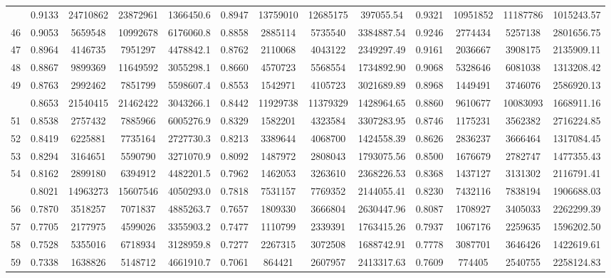 \documentclass[
  12pt,
]{article}
\begin{document}
\begin{longtable}[t]{lcccccccccccc}
\addlinespace
45 & 0.9133 & 24710862 & 23872961 & 1366450.6 & 0.8947 & 13759010 & 12685175 & 397055.54 & 0.9321 & 10951852 & 11187786 & 1015243.57\\
46 & 0.9053 & 5659548 & 10992678 & 6176060.8 & 0.8858 & 2885114 & 5735540 & 3384887.54 & 0.9246 & 2774434 & 5257138 & 2801656.75\\
47 & 0.8964 & 4146735 & 7951297 & 4478842.1 & 0.8762 & 2110068 & 4043122 & 2349297.49 & 0.9161 & 2036667 & 3908175 & 2135909.11\\
48 & 0.8867 & 9899369 & 11649592 & 3055298.1 & 0.8660 & 4570723 & 5568554 & 1734892.90 & 0.9068 & 5328646 & 6081038 & 1313208.42\\
49 & 0.8763 & 2992462 & 7851799 & 5598607.4 & 0.8553 & 1542971 & 4105723 & 3021689.89 & 0.8968 & 1449491 & 3746076 & 2586920.13\\
\addlinespace
50 & 0.8653 & 21540415 & 21462422 & 3043266.1 & 0.8442 & 11929738 & 11379329 & 1428964.65 & 0.8860 & 9610677 & 10083093 & 1668911.16\\
51 & 0.8538 & 2757432 & 7885966 & 6005276.9 & 0.8329 & 1582201 & 4323584 & 3307283.95 & 0.8746 & 1175231 & 3562382 & 2716224.85\\
52 & 0.8419 & 6225881 & 7735164 & 2727730.3 & 0.8213 & 3389644 & 4068700 & 1424558.39 & 0.8626 & 2836237 & 3666464 & 1317084.45\\
53 & 0.8294 & 3164651 & 5590790 & 3271070.9 & 0.8092 & 1487972 & 2808043 & 1793075.56 & 0.8500 & 1676679 & 2782747 & 1477355.43\\
54 & 0.8162 & 2899180 & 6394912 & 4482201.5 & 0.7962 & 1462053 & 3263610 & 2368226.53 & 0.8368 & 1437127 & 3131302 & 2116791.41\\
\addlinespace
55 & 0.8021 & 14963273 & 15607546 & 4050293.0 & 0.7818 & 7531157 & 7769352 & 2144055.41 & 0.8230 & 7432116 & 7838194 & 1906688.03\\
56 & 0.7870 & 3518257 & 7071837 & 4885263.7 & 0.7657 & 1809330 & 3666804 & 2630447.96 & 0.8087 & 1708927 & 3405033 & 2262299.39\\
57 & 0.7705 & 2177975 & 4599026 & 3355903.2 & 0.7477 & 1110799 & 2339391 & 1763415.26 & 0.7937 & 1067176 & 2259635 & 1596202.50\\
58 & 0.7528 & 5355016 & 6718934 & 3128959.8 & 0.7277 & 2267315 & 3072508 & 1688742.91 & 0.7778 & 3087701 & 3646426 & 1422619.61\\
59 & 0.7338 & 1638826 & 5148712 & 4661910.7 & 0.7061 & 864421 & 2607957 & 2413317.63 & 0.7609 & 774405 & 2540755 & 2258124.83\\

\end{longtable}
\end{document}

